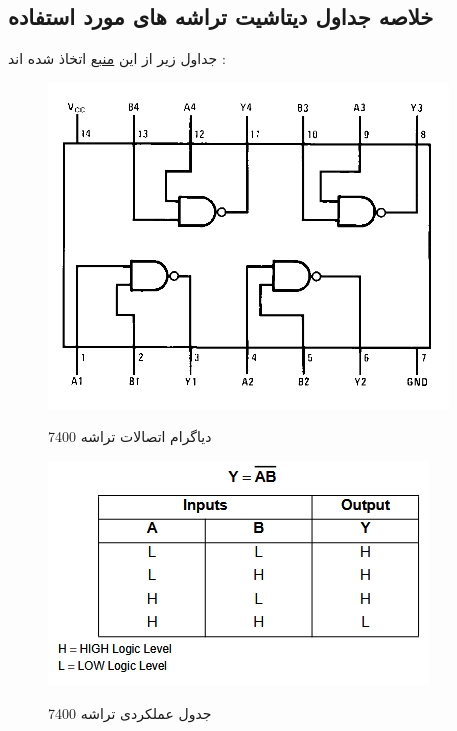 \documentclass[twoside]{article}
\begin{document}
		\newpage
		\subsection*{خلاصه جداول دیتاشیت تراشه های مورد استفاده}
			جداول زیر از این \href{https://cdn.datasheetspdf.com/pdf-down/7/4/0/7400_FairchildSemiconductor.pdf}{منبع} اتخاذ شده اند :
			\begin{figure}[h!]
				\begin{center}
					\includegraphics[scale=0.75]{DM74SL00_connection_diagram}‎
					\caption{دیاگرام اتصالات تراشه 7400}
				\end{center}
			\end{figure} 
			\begin{figure}[h!]
				\begin{center}
					\includegraphics[scale=0.75]{DM74SL00_function_table}‎
					\caption{جدول عملکردی تراشه 7400}
				\end{center}
			\end{figure} 
		
\end{document}
